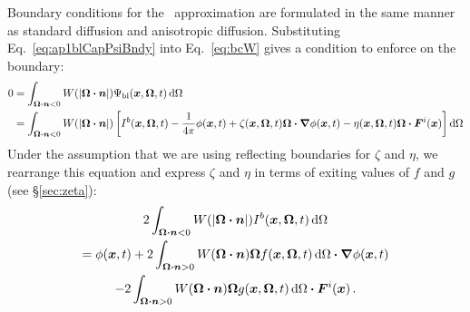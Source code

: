 Boundary conditions for the \APone\ approximation are formulated in the same
manner as standard diffusion and anisotropic diffusion.
Substituting Eq.~\eqref{eq:ap1blCapPsiBndy} into Eq.~\eqref{eq:bcW} gives a
condition to enforce on the boundary:
\begin{align*}
  0 &= \int_{\bm{\Omega} \bm{\cdot} \bm{n} < 0} W(\left| \bm{\Omega} \bm{\cdot} \bm{n} \right|)
  \Psi_\mathrm{bl} (\bm{x}, \bm{\Omega}, t) \mathop{}\!\mathrm{d}\Omega
  \\
  &= \int_{\bm{\Omega} \bm{\cdot} \bm{n} < 0} W(\left| \bm{\Omega} \bm{\cdot} \bm{n} \right|)
 \left[ I^b(\bm{x}, \bm{\Omega}, t) - \frac{1}{4\pi} \phi(\bm{x}, t)
  + \zeta(\bm{x}, \bm{\Omega}, t) \bm{\Omega}\bm{\cdot} \bm{\nabla} \phi(\bm{x}, t)
  - \eta(\bm{x}, \bm{\Omega}, t) \bm{\Omega}\bm{\cdot} \bm{F}^i(\bm{x})\right]
  \mathop{}\!\mathrm{d}\Omega
\end{align*}
Under the assumption that we are using reflecting boundaries for $\zeta$
and $\eta$, we rearrange this equation and express $\zeta$ and $\eta$ in terms of
exiting values of $f$ and $g$ (see \S\ref{sec:zeta}):
\begin{multline}\label{eq:ap1loBndy}
  2 \int_{\bm{\Omega} \bm{\cdot} \bm{n} < 0} W(\left| \bm{\Omega} \bm{\cdot} \bm{n} \right|)
  I^b(\bm{x}, \bm{\Omega}, t) \mathop{}\!\mathrm{d}\Omega
  \\
  =
 \phi(\bm{x}, t)
  + 2\int_{\bm{\Omega}\bm{\cdot} \bm{n} > 0} W(\bm{\Omega} \bm{\cdot} \bm{n})
  \bm{\Omega} f(\bm{x}, \bm{\Omega},t) \mathop{}\!\mathrm{d}\Omega
  \bm{\cdot} \bm{\nabla} \phi(\bm{x}, t) 
  \\
  - 2\int_{\bm{\Omega}\bm{\cdot} \bm{n} > 0} W(\bm{\Omega} \bm{\cdot} \bm{n})
  \bm{\Omega} g(\bm{x}, \bm{\Omega},t) \mathop{}\!\mathrm{d}\Omega
  \bm{\cdot} \bm{F}^i(\bm{x}) 
  \,.
\end{multline}

